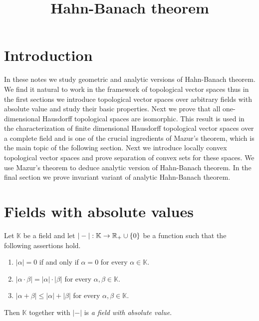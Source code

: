 



\title{Hahn-Banach theorem}
\date{}
\maketitle

\section{Introduction}
\noindent
In these notes we study geometric and analytic versions of Hahn-Banach theorem. We find it natural to work in the framework of topological vector spaces thus in the first sections we introduce topological vector spaces over arbitrary fields with absolute value and study their basic properties. Next we prove that all one-dimensional Hausdorff topological spaces are isomorphic. This result is used in the characterization of finite dimensional Hausdorff topological vector spaces over a complete field and is one of the crucial ingredients of Mazur's theorem, which is the main topic of the following section. Next we introduce locally convex topological vector spaces and prove separation of convex sets for these spaces. We use Mazur's theorem to deduce analytic version of Hahn-Banach theorem. In the final section we prove invariant variant of analytic Hahn-Banach theorem.

\section{Fields with absolute values}

\begin{definition}
Let $\mathbb{K}$ be a field and let $|-|:\mathbb{K}\rightarrow {\mathbb R}_+\cup \{0\}$ be a function such that the following assertions hold.
\begin{enumerate}[label=\textbf{(\arabic*)}, leftmargin=*]
\item $|\alpha| = 0$ if and only if $\alpha = 0$ for every $\alpha \in \mathbb{K}$.
\item $|\alpha\cdot \beta| = |\alpha|\cdot |\beta|$ for every $\alpha,\beta \in \mathbb{K}$.
\item $|\alpha + \beta|\leq |\alpha| + |\beta|$ for every $\alpha,\beta \in \mathbb{K}$.
\end{enumerate}
Then $\mathbb{K}$ together with $|-|$ is \textit{a field with absolute value}.
\end{definition}

